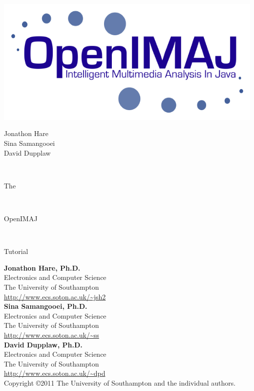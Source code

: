 \documentclass[10pt,a4paper,twoside,extrafontsizes]{memoir}
\newlength\titlepage
\newlength\titlepagefull
\begin{document}
	
\pagestyle{empty}

\begin{minipage}{0.5\titlepage}
\includegraphics{OpenIMAJ.png}
\end{minipage}
\hspace{0.001pt}
\begin{minipage}{0.5\titlepage}
\Huge
\flushright
Jonathon Hare\\
Sina Samangooei\\
David Dupplaw
\end{minipage}
\\[10cm]
\begin{minipage}{\titlepage}
\fontsize{60}{100}\selectfont\flushright The
\end{minipage}
\\[1cm]
\colorbox{nicered}{\parbox{\titlepagefull}{
	\parbox{\titlepage}{
		\color{white}\fontsize{80}{120}\selectfont\flushright OpenIMAJ\\[0.4cm]}
	}
}
\\[0.8cm]
\begin{minipage}{\titlepage}
\fontsize{60}{100}\selectfont\flushright Tutorial
\end{minipage}
\clearpage
\textbf{{\LARGE Jonathon Hare,} Ph.D.}\\
Electronics and Computer Science\\
The University of Southampton\\
\url{http://www.ecs.soton.ac.uk/~jsh2}\\[0.5cm]
\textbf{{\LARGE Sina Samangooei,} Ph.D.}\\
Electronics and Computer Science\\
The University of Southampton\\
\url{http://www.ecs.soton.ac.uk/~ss}\\[0.5cm]
\textbf{{\LARGE David Dupplaw,} Ph.D.}\\
Electronics and Computer Science\\
The University of Southampton\\
\url{http://www.ecs.soton.ac.uk/~dpd}
\\[2cm]
Copyright \copyright 2011 The University of Southampton and the individual authors.\\[0.5cm]
\end{document}
